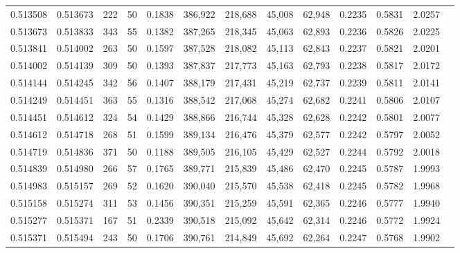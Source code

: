 \begin{tabular}{rrrrrrrrrrrrr}
0.513508 & 0.513673 &   222 &  50 &                                     0.1838 & 386,922 & 218,688 &  45,008 &  62,948 & 0.2235 & 0.5831 & 2.0257 \\
0.513673 & 0.513833 &   343 &  55 &                                     0.1382 & 387,265 & 218,345 &  45,063 &  62,893 & 0.2236 & 0.5826 & 2.0225 \\
0.513841 & 0.514002 &   263 &  50 &                                     0.1597 & 387,528 & 218,082 &  45,113 &  62,843 & 0.2237 & 0.5821 & 2.0201 \\
0.514002 & 0.514139 &   309 &  50 &                                     0.1393 & 387,837 & 217,773 &  45,163 &  62,793 & 0.2238 & 0.5817 & 2.0172 \\
0.514144 & 0.514245 &   342 &  56 &                                     0.1407 & 388,179 & 217,431 &  45,219 &  62,737 & 0.2239 & 0.5811 & 2.0141 \\
0.514249 & 0.514451 &   363 &  55 &                                     0.1316 & 388,542 & 217,068 &  45,274 &  62,682 & 0.2241 & 0.5806 & 2.0107 \\
0.514451 & 0.514612 &   324 &  54 &                                     0.1429 & 388,866 & 216,744 &  45,328 &  62,628 & 0.2242 & 0.5801 & 2.0077 \\
0.514612 & 0.514718 &   268 &  51 &                                     0.1599 & 389,134 & 216,476 &  45,379 &  62,577 & 0.2242 & 0.5797 & 2.0052 \\
0.514719 & 0.514836 &   371 &  50 &                                     0.1188 & 389,505 & 216,105 &  45,429 &  62,527 & 0.2244 & 0.5792 & 2.0018 \\
0.514839 & 0.514980 &   266 &  57 &                                     0.1765 & 389,771 & 215,839 &  45,486 &  62,470 & 0.2245 & 0.5787 & 1.9993 \\
0.514983 & 0.515157 &   269 &  52 &                                     0.1620 & 390,040 & 215,570 &  45,538 &  62,418 & 0.2245 & 0.5782 & 1.9968 \\
0.515158 & 0.515274 &   311 &  53 &                                     0.1456 & 390,351 & 215,259 &  45,591 &  62,365 & 0.2246 & 0.5777 & 1.9940 \\
0.515277 & 0.515371 &   167 &  51 &                                     0.2339 & 390,518 & 215,092 &  45,642 &  62,314 & 0.2246 & 0.5772 & 1.9924 \\
0.515371 & 0.515494 &   243 &  50 &                                     0.1706 & 390,761 & 214,849 &  45,692 &  62,264 & 0.2247 & 0.5768 & 1.9902 \\

\end{tabular}
